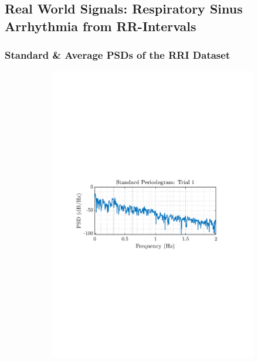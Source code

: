 \documentclass[12pt]{article}
\numberwithin{equation}{section}
\begin{document}
	\pagebreak
	
	\subsection{Real World Signals: Respiratory Sinus Arrhythmia from RR-Intervals} \label{sec: 1-5-real-world-signals}
	
	\subsubsection{Standard \& Average PSDs of the RRI Dataset}
	\begin{figure}[H]
		\centering
		\begin{subfigure}{0.49\textwidth}
			\centering
			\includegraphics[trim={2.2cm 11cm 3.15cm  11.2cm}, clip, width=\textwidth]{../MATLAB/figures/q1_5a_fig01.pdf} 
		\end{subfigure}

\end{figure}
\end{document}

